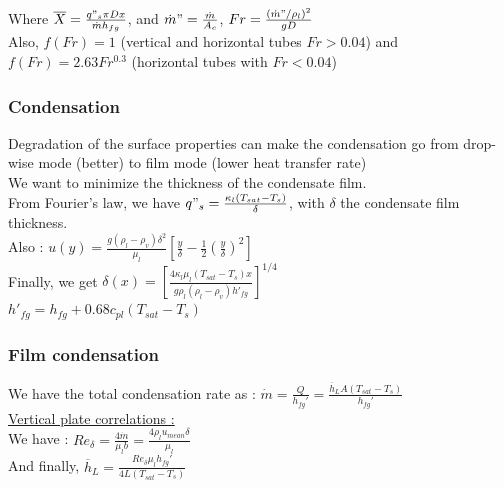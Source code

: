 \documentclass[../main.tex]{subfiles}
\begin{document}
Where $\overline{X} = \frac{q"_s \pi Dx}{\dot{m} h_{fg}}$, and $\dot{m}" = \frac{\dot{m}}{A_c}$, $Fr = \frac{(\dot{m}"/\rho_l)^2}{gD}$\\

Also, $f(Fr) = 1$ (vertical and horizontal tubes $Fr>0.04$) and $f(Fr) = 2.63 Fr^{0.3}$ (horizontal tubes with $Fr<0.04$)\\

\subsubsection{Condensation}
Degradation of the surface properties can make the condensation go from drop-wise mode (better) to film mode (lower heat transfer rate)\\

We want to minimize the thickness of the condensate film.\\

From Fourier's law, we have $q"_s = \frac{\kappa_l (T_{sat}-T_s)}{\delta}$, with $\delta$ the condensate film thickness.\\

Also : $u(y) = \frac{g (\rho_l - \rho_v)\delta^2}{\mu_l} [\frac{y}{\delta} - \frac{1}{2} (\frac{y}{\delta})^2]$\\

Finally, we get $\delta(x) = [\frac{4\kappa_l \mu_l (T_{sat}-T_s)x}{g\rho_l (\rho_l - \rho_v) h'_{fg}}]^{1/4}$\\
$h'_{fg} = h_{fg} + 0.68c_{pl} (T_{sat}-T_s)$\\


\subsubsection{Film condensation}

We have the total condensation rate as : $\dot{m} = \frac{Q}{h_{fg}'} = \frac{\overline{h}_L A(T_{sat}-T_s)}{h_{fg}'}$\\

\quad \underline{Vertical plate correlations :}\\

We have : $Re_\delta = \frac{4\dot{m}}{\mu_l b} = \frac{4 \rho_l u_{mean} \delta}{\mu_l}$\\
And finally, $\overline{h}_L = \frac{Re_\delta \mu_l h_{fg}'}{4L (T_{sat}-T_s)}$\\
\end{document}
